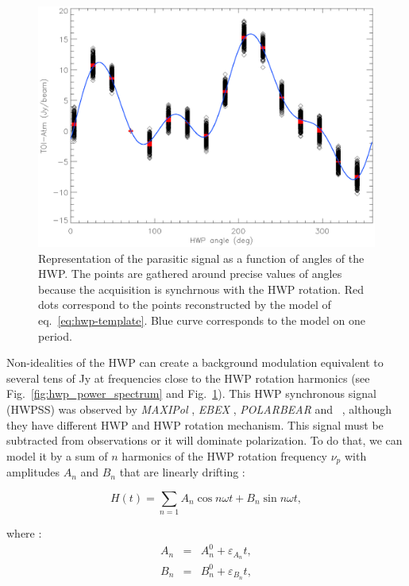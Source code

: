 \begin{figure}[h]
\center
\includegraphics[clip, angle=0, width=\columnwidth]{Figures/hwpss_2pi.eps}
\caption{Representation of the parasitic signal as a function of angles of the HWP. The points are gathered around precise values of angles because the acquisition is synchrnous with the HWP rotation. Red dots correspond to the points reconstructed by the model of eq.~\ref{eq:hwp-template}. Blue curve corresponds to the model on one period.}
\label{fig:hwpss_2pi}
\end{figure}

Non-idealities of the HWP can create a background modulation equivalent to several tens of Jy at frequencies close to the HWP rotation harmonics \citep{2017A&A...599A..34R} (see Fig.~\ref{fig:hwp_power_spectrum} and Fig.~\ref{fig:hwpss_2pi}). This HWP synchronous signal (HWPSS) was observed by \emph{MAXIPol} \citep{2007ApJ...665...42J}, \emph{EBEX} \citep{2010SPIE.7741E..1CR}, \emph{POLARBEAR} \citep{2017JCAP...05..008T} and \nika\ \citep{2017A&A...599A..34R}, although they have different HWP and HWP rotation mechanism. This signal must be subtracted from observations or it will dominate polarization. To do that, we can model it by a sum of $n$ harmonics of the HWP rotation frequency $\nu_{p}$ with amplitudes $A_{n}$ and $B_{n}$ that are linearly drifting :

\begin{equation}
H(t) = \sum_{n=1} A_{n} \cos n\omega t + B_{n} \sin n \omega t , 
\label{eq:hwp-template}
\end{equation}

where : 
\begin{eqnarray}
A_{n}  &=& A_{n}^{0} + \varepsilon_{A_{n}}t,\\
B_{n}  &=& B_{n}^{0} + \varepsilon_{B_{n}}t, 
\end{eqnarray}

